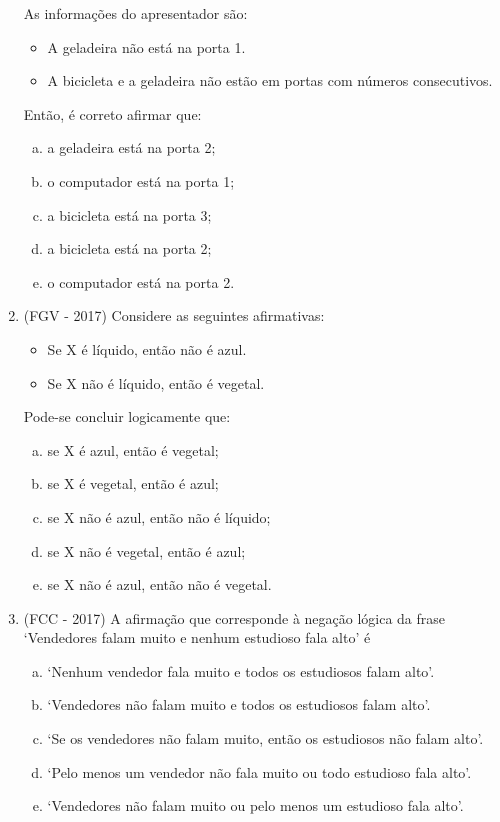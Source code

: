 \begin{enumerate}
As informações do apresentador são:
\begin{itemize}
 \item A geladeira não está na porta 1.
 \item A bicicleta e a geladeira não estão em portas com números consecutivos.
\end{itemize}
Então, é correto afirmar que:
\begin{enumerate}[a)]
\item a geladeira está na porta 2;
\item o computador está na porta 1; 
\item a bicicleta está na porta 3;
\item a bicicleta está na porta 2;
\item o computador está na porta 2. 
\end{enumerate}

\item (FGV - 2017) Considere as seguintes afirmativas:
\begin{itemize}
\item Se X é líquido, então não é azul.
\item Se X não é líquido, então é vegetal.
\end{itemize}
Pode-se concluir logicamente que:
\begin{enumerate}[a)]
\item se X é azul, então é vegetal;
\item se X é vegetal, então é azul;
\item se X não é azul, então não é líquido;
\item se X não é vegetal, então é azul;
\item se X não é azul, então não é vegetal.
\end{enumerate}

\item (FCC - 2017) A afirmação que corresponde à negação lógica da frase ‘Vendedores falam muito e nenhum estudioso fala alto’ é 
\begin{enumerate}[a)]
\item ‘Nenhum vendedor fala muito e todos os estudiosos falam alto’. 
\item ‘Vendedores não falam muito e todos os estudiosos falam alto’. 
\item ‘Se os vendedores não falam muito, então os estudiosos não falam alto’.
\item ‘Pelo menos um vendedor não fala muito ou todo estudioso fala alto’.
\item ‘Vendedores não falam muito ou pelo menos um estudioso fala alto’.
\end{enumerate}


\end{enumerate}
